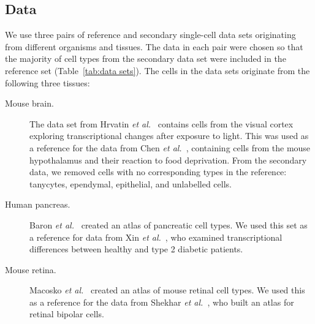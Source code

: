 \documentclass[runningheads]{llncs}
\newcommand{\etal}{\textit{et al.}}
\begin{document}
\subsection{Data}

We use three pairs of reference and secondary single-cell data sets originating
from different organisms and tissues. The data in each pair were chosen so that
the majority of cell types from the secondary data set were included in the
reference set (Table~\ref{tab:data sets}). The cells in the data sets
originate from the following three tissues:

\begin{description}
\item[Mouse brain.] The data set from Hrvatin \etal~\cite{Hrvatin2018} contains
cells from the visual cortex exploring transcriptional changes after exposure
to light. This was used as a reference for the data from Chen
\etal~\cite{Chen2017}, containing cells from the mouse hypothalamus and
their reaction to food deprivation. From the secondary data, we removed cells
with no corresponding types in the reference: tanycytes, ependymal,
epithelial, and unlabelled cells.

\item[Human pancreas.] Baron \etal~\cite{Baron2016} created
an atlas of pancreatic cell types. We used this set as a reference
for data from Xin \etal~\cite{Xin2016}, who examined transcriptional
differences between healthy and type 2 diabetic patients.

\item[Mouse retina.] Macosko \etal~\cite{Macosko2015} created
an atlas of mouse retinal cell types. We used this as a reference
for the data from Shekhar \etal~\cite{Sekhar2016}, who built an atlas for
retinal bipolar cells.
\end{description}
\end{document}
